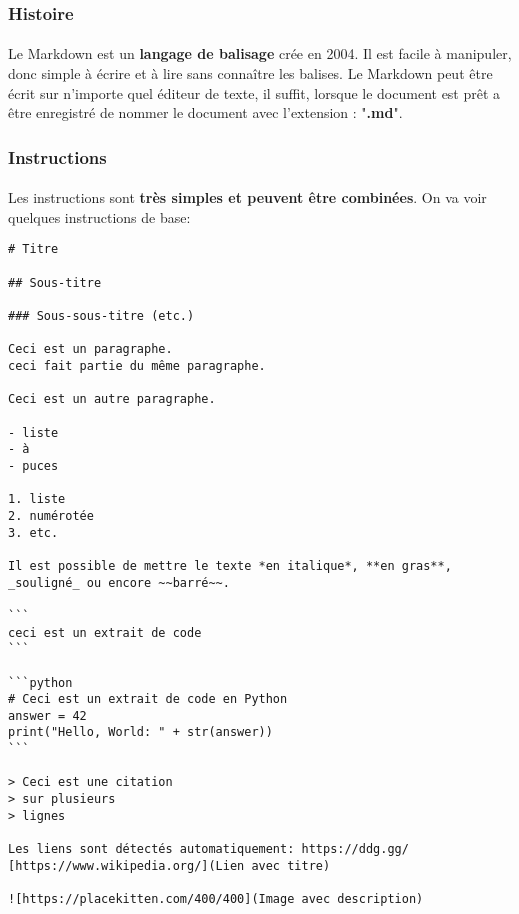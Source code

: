 \subsubsection*{Histoire}

\paragraph{} Le Markdown est un \textbf{langage de balisage} crée en 2004. Il
est facile à manipuler, donc simple à écrire et à lire sans connaître les
balises. Le Markdown peut être écrit sur n'importe quel éditeur de texte, il
suffit, lorsque le document est prêt a être enregistré de nommer le document
avec l'extension : "\textbf{.md}".

\subsubsection*{Instructions}

\paragraph{} Les instructions sont \textbf{très simples et peuvent être
combinées}. On va voir quelques instructions de base:

\begin{verbatim}
# Titre

## Sous-titre

### Sous-sous-titre (etc.)

Ceci est un paragraphe.
ceci fait partie du même paragraphe.

Ceci est un autre paragraphe.

- liste
- à
- puces

1. liste
2. numérotée
3. etc.

Il est possible de mettre le texte *en italique*, **en gras**,
_souligné_ ou encore ~~barré~~.

```
ceci est un extrait de code
```

```python
# Ceci est un extrait de code en Python
answer = 42
print("Hello, World: " + str(answer))
```

> Ceci est une citation
> sur plusieurs
> lignes

Les liens sont détectés automatiquement: https://ddg.gg/
[https://www.wikipedia.org/](Lien avec titre)

![https://placekitten.com/400/400](Image avec description)
\end{verbatim}
